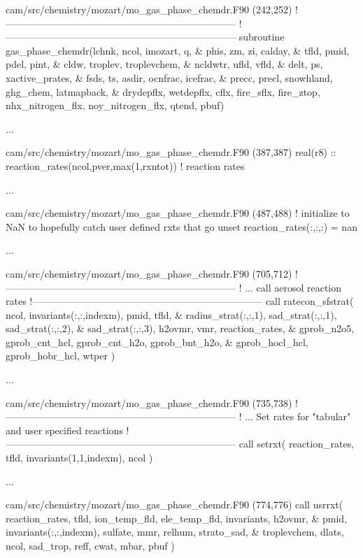 \documentclass[titlepage]{article}
\begin{document}
\begin{blockcode}[commandchars=\\\{\}]
\color{gray}cam/src/chemistry/mozart/mo_gas_phase_chemdr.F90 (242,252)
!-----------------------------------------------------------------------
!-----------------------------------------------------------------------
  subroutine gas_phase_chemdr(lchnk, ncol, imozart, q, &
                              phis, zm, zi, calday, &
                              tfld, pmid, pdel, pint,  &
                              cldw, troplev, troplevchem, &
                              ncldwtr, ufld, vfld,  &
                              delt, ps, xactive_prates, &
                              fsds, ts, asdir, ocnfrac, icefrac, &
                              precc, precl, snowhland, ghg_chem, latmapback, &
                              drydepflx, wetdepflx, cflx, fire_sflx, fire_ztop, nhx_nitrogen_flx, noy_nitrogen_flx, qtend, pbuf)

\color{gray}...

\color{gray}cam/src/chemistry/mozart/mo_gas_phase_chemdr.F90 (387,387)
    real(r8)     ::  reaction_rates(ncol,pver,max(1,rxntot))      ! reaction rates

\color{gray}...

\color{gray}cam/src/chemistry/mozart/mo_gas_phase_chemdr.F90 (487,488)
    ! initialize to NaN to hopefully catch user defined rxts that go unset
    reaction_rates(:,:,:) = nan

\color{gray}...

\color{gray}cam/src/chemistry/mozart/mo_gas_phase_chemdr.F90 (705,712)
       !-----------------------------------------------------------------------
       !        ... call aerosol reaction rates
       !-----------------------------------------------------------------------
       call ratecon_sfstrat( ncol, invariants(:,:,indexm), pmid, tfld, &
            radius_strat(:,:,1), sad_strat(:,:,1), sad_strat(:,:,2), &
            sad_strat(:,:,3), h2ovmr, vmr, reaction_rates, &
            gprob_n2o5, gprob_cnt_hcl, gprob_cnt_h2o, gprob_bnt_h2o, &
            gprob_hocl_hcl, gprob_hobr_hcl, wtper )

\color{gray}...

\color{gray}cam/src/chemistry/mozart/mo_gas_phase_chemdr.F90 (735,738)
    !-----------------------------------------------------------------------
    !       ...  Set rates for "tabular" and user specified reactions
    !-----------------------------------------------------------------------
    call setrxt( reaction_rates, tfld, invariants(1,1,indexm), ncol )

\color{gray}...

\color{gray}cam/src/chemistry/mozart/mo_gas_phase_chemdr.F90 (774,776)
    call usrrxt( reaction_rates, tfld, ion_temp_fld, ele_temp_fld, invariants, h2ovmr, &
                 pmid, invariants(:,:,indexm), sulfate, mmr, relhum, strato_sad, &
                 troplevchem, dlats, ncol, sad_trop, reff, cwat, mbar, pbuf )
\end{blockcode}
\end{document}
